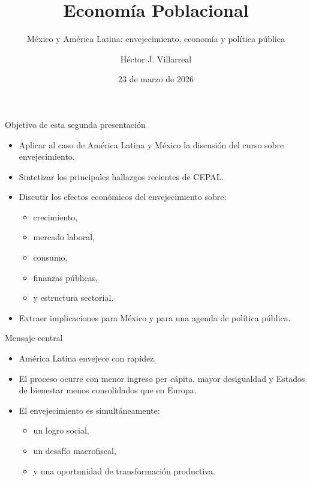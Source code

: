 \documentclass{beamer}
\title{Economía Poblacional}
\subtitle{México y América Latina: envejecimiento, economía y política pública}
\author{Héctor J. Villarreal}
\date{23 de marzo de 2026}
\begin{document}
\begin{frame}
\titlepage
\end{frame}

\begin{frame}{Objetivo de esta segunda presentación}
\begin{itemize}
    \item Aplicar al caso de América Latina y México la discusión del curso sobre envejecimiento.
    \item Sintetizar los principales hallazgos recientes de CEPAL.
    \item Discutir los efectos económicos del envejecimiento sobre:
    \begin{itemize}
        \item crecimiento,
        \item mercado laboral,
        \item consumo,
        \item finanzas públicas,
        \item y estructura sectorial.
    \end{itemize}
    \item Extraer implicaciones para México y para una agenda de política pública.
\end{itemize}
\end{frame}

\begin{frame}{Mensaje central}
\begin{itemize}
    \item América Latina envejece con rapidez.
    \item El proceso ocurre con menor ingreso per cápita, mayor desigualdad y Estados de bienestar menos consolidados que en Europa.
    \item El envejecimiento es simultáneamente:
    \begin{itemize}
        \item un logro social,
        \item un desafío macrofiscal,
        \item y una oportunidad de transformación productiva.
    \end{itemize}
\end{itemize}
\end{frame}
\end{document}
